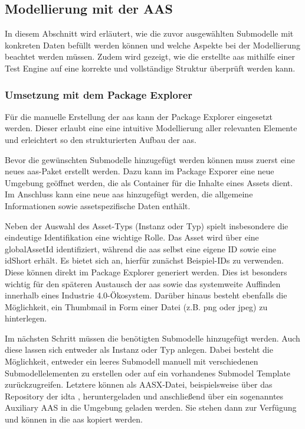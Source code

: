 





\newpage
\subsection{Modellierung mit der AAS}
In diesem Abschnitt wird erläutert, wie die zuvor ausgewählten Submodelle mit konkreten Daten befüllt werden können und welche Aspekte bei der Modellierung beachtet werden müssen.
Zudem wird gezeigt, wie die erstellte \acs{aas} mithilfe einer Test Engine auf eine korrekte und vollständige Struktur überprüft werden kann. 
\subsubsection{Umsetzung mit dem Package Explorer}
Für die manuelle Erstellung der \acs{aas} kann der Package Explorer eingesetzt werden.
Dieser erlaubt eine eine intuitive Modellierung aller relevanten Elemente und erleichtert so den strukturierten Aufbau der \acs{aas}.

Bevor die gewünschten Submodelle hinzugefügt werden können muss zuerst eine neues \acs{aas}-Paket erstellt werden.
Dazu kann im Package Exporer eine neue Umgebung geöffnet werden, die als Container für die Inhalte eines Assets dient.
Im Anschluss kann eine neue \acs{aas} hinzugefügt werden, die allgemeine Informationen sowie assetspezifische Daten enthält.

Neben der Auswahl des Asset-Typs (Instanz oder Typ) spielt insbesondere die eindeutige Identifikation eine wichtige Rolle.
Das Asset wird über eine globalAssetId identifiziert, während die \acs{aas} selbst eine eigene ID sowie eine idShort erhält.
Es bietet sich an, hierfür zunächst Beispiel-IDs zu verwenden. Diese können direkt im Package Explorer generiert werden.
Dies ist besonders wichtig für den späteren Austausch der \acs{aas} sowie das systemweite Auffinden innerhalb eines Industrie 4.0-Ökosystem.
Darüber hinaus besteht ebenfalls die Möglichkeit, ein Thumbmail in Form einer Datei (z.B. png oder jpeg) zu hinterlegen.

Im nächsten Schritt müssen die benötigten Submodelle hinzugefügt werden. 
Auch diese lassen sich entweder als Instanz oder Typ anlegen.
Dabei besteht die Möglichkeit, entweder ein leeres Submodell manuell mit verschiedenen Submodellelementen zu erstellen oder auf ein vorhandenes Submodel Template zurückzugreifen.
Letztere können als AASX-Datei, beispielsweise über das Repository der \acs{idta} \cite{idtaTemplates}, heruntergeladen und anschließend über ein sogenanntes Auxiliary AAS in die Umgebung geladen werden.
Sie stehen dann zur Verfügung und können in die \acs{aas} kopiert werden.

